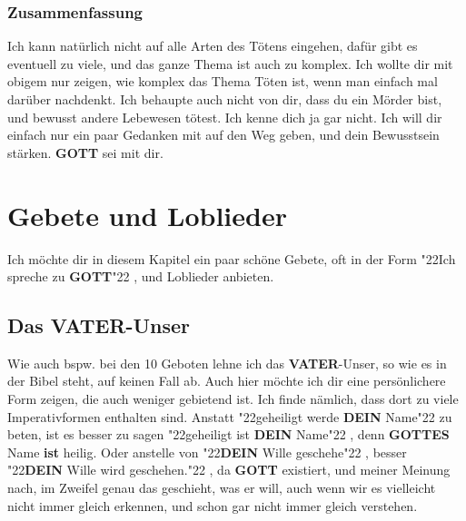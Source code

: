 \documentclass[10pt,a5paper]{article}
\newcommand{\Dein}[0]{\textbf{DEIN}}
\newcommand{\Gottes}[0]{\textbf{GOTTES}}
\newcommand{\Gott}[0]{\textbf{GOTT}}
\newcommand{\Vater}[0]{\textbf{VATER}}
\newcommand{\q}[1]{\char"22{#1}\char"22 }
\begin{document}
	\subsubsection{Zusammenfassung}
		Ich kann nat\"urlich nicht auf alle Arten des T\"otens eingehen,
		daf\"ur gibt es eventuell zu viele,
		und das ganze Thema ist auch zu komplex.
		Ich wollte dir mit obigem nur zeigen,
		wie komplex das Thema T\"oten ist,
		wenn man einfach mal dar\"uber nachdenkt.
		Ich behaupte auch nicht von dir,
		dass du ein M\"order bist,
		und bewusst andere Lebewesen t\"otest.
		Ich kenne dich ja gar nicht.
		Ich will dir einfach nur ein paar Gedanken mit auf den Weg geben,
		und dein Bewusstsein st\"arken.
		{\Gott} sei mit dir.
			
	\newpage
	\section{Gebete und Loblieder}
		Ich m\"ochte dir in diesem Kapitel ein paar sch\"one Gebete,
		oft in der Form \q{Ich spreche zu {\Gott}},
		und Loblieder anbieten.
	
	\subsection{Das {\Vater}-Unser}
		Wie auch bspw. bei den 10 Geboten lehne ich das {\Vater}-Unser,
		so wie es in der Bibel steht,
		auf keinen Fall ab.
		Auch hier m\"ochte ich dir eine pers\"onlichere Form zeigen,
		die auch weniger gebietend ist.
		Ich finde n\"amlich,
		dass dort zu viele Imperativformen enthalten sind.
		Anstatt \q{geheiligt werde {\Dein} Name} zu beten,
		ist es besser zu sagen \q{geheiligt ist {\Dein} Name},
		denn {\Gottes} Name \textbf{ist} heilig.
		Oder anstelle von \q{{\Dein} Wille geschehe},
		besser \q{{\Dein} Wille wird geschehen.},
		da {\Gott} existiert,
		und meiner Meinung nach,
		im Zweifel genau das geschieht,
		was er will,
		auch wenn wir es vielleicht nicht immer gleich erkennen,
		und schon gar nicht immer gleich verstehen.
	
\end{document}
